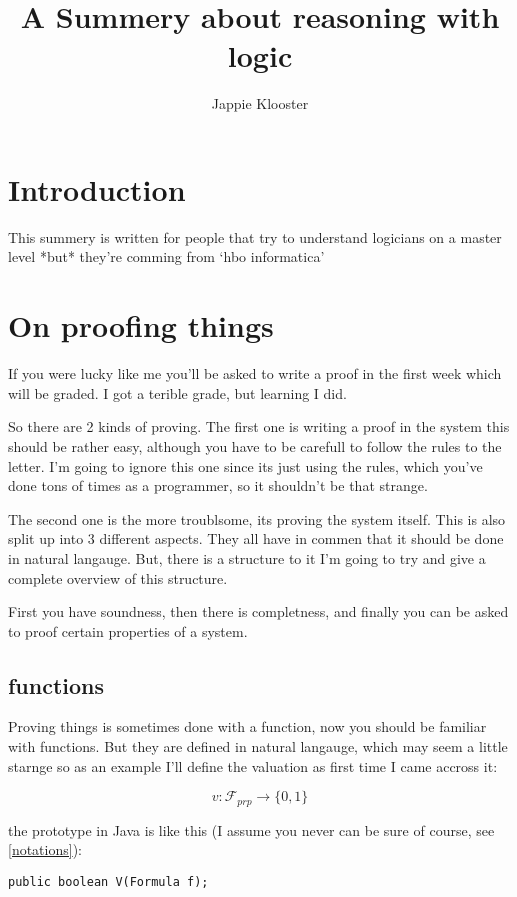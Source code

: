 \documentclass{article}
\begin{document}
\lstset{language=Java}
\author{Jappie Klooster}
\title{A Summery about reasoning with logic}
\maketitle

\section{Introduction}
This summery is written for people that try to understand logicians on a master
level *but* they're comming from `hbo informatica'

\section{On proofing things}
If you were lucky like me you'll be asked to write a proof in the first week
which will be graded. I got a terible grade, but learning I did.

So there are 2 kinds of proving. The first one is writing a proof in the system
this should be rather easy, although you have to be carefull to follow the
rules to the letter. I'm going to ignore this one since its just using the
rules, which you've done tons of times as a programmer, so it shouldn't be
that strange.

The second one is the more troublsome, its proving the system itself. This
is also split up into 3 different aspects. They all have in commen that
it should be done in natural langauge. But, there is a structure to it
I'm going to try and give a complete overview of this structure.

First you have soundness, then there is completness, and finally you can be
asked to proof certain properties of a system.

\subsection{functions}
Proving things is sometimes done with a function,
now you should be familiar with functions.
But they are defined in natural langauge, which may seem a little starnge
so as an example I'll define the valuation as first time I came accross it:

\[v:\mathcal{F}_{prp} \to \{0,1\}\]

the prototype in Java is like this (I assume you never can be sure of course,
see \autoref{notations}):


\begin{lstlisting}[frame=single] 
	public boolean V(Formula f);
\end{lstlisting}
\end{document}
